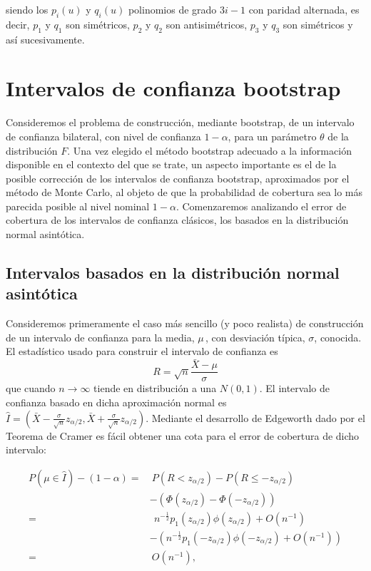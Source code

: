 \documentclass[]{book}
\theoremstyle{definition}
\theoremstyle{definition}
\theoremstyle{definition}
\theoremstyle{remark}
\begin{document}
siendo los \(p_i\left( u \right)\) y \(q_i\left( u \right)\) polinomios
de grado \(3i-1\) con paridad alternada, es decir, \(p_1\) y \(q_1\) son
simétricos, \(p_2\) y \(q_2\) son antisimétricos, \(p_3\) y \(q_3\) son
simétricos y así sucesivamente.

\chapter{Intervalos de confianza bootstrap}\label{cap5}

Consideremos el problema de construcción, mediante bootstrap, de un
intervalo de confianza bilateral, con nivel de confianza \(1-\alpha\),
para un parámetro \(\theta\) de la distribución \(F\). Una vez elegido
el método bootstrap adecuado a la información disponible en el contexto
del que se trate, un aspecto importante es el de la posible corrección
de los intervalos de confianza bootstrap, aproximados por el método de
Monte Carlo, al objeto de que la probabilidad de cobertura sea lo más
parecida posible al nivel nominal \(1-\alpha\). Comenzaremos analizando
el error de cobertura de los intervalos de confianza clásicos, los
basados en la distribución normal asintótica.

\section{Intervalos basados en la distribución normal
asintótica}\label{intervalos-basados-en-la-distribucion-normal-asintotica}

Consideremos primeramente el caso más sencillo (y poco realista) de
construcción de un intervalo de confianza para la media, \(\mu \,\), con
desviación típica, \(\sigma\), conocida. El estadístico usado para
construir el intervalo de confianza es
\[R=\sqrt{n}\frac{\bar{X}-\mu }{\sigma }\]que cuando
\(n\rightarrow \infty\) tiende en distribución a una
\(N\left( 0,1 \right)\). El intervalo de confianza basado en dicha
aproximación normal es
\(\hat{I}=\left( \bar{X}-\frac{\sigma }{\sqrt{n}}z_{\alpha /2}, \bar{X}+\frac{\sigma }{\sqrt{n}}z_{\alpha /2} \right)\).
Mediante el desarrollo de Edgeworth dado por el Teorema de Cramer es
fácil obtener una cota para el error de cobertura de dicho intervalo:

\[\begin{aligned}
P\left( \mu \in \hat{I} \right) -\left( 1-\alpha \right) =&\  P\left(
R<z_{\alpha /2} \right) -P\left( R\leq -z_{\alpha /2} \right) \\
&-\left( \Phi \left( z_{\alpha /2} \right) -\Phi \left( -z_{\alpha
/2} \right) \right) \\
=&\ \ n^{-\frac{1}{2}}p_1\left( z_{\alpha /2} \right) \phi \left( z_{\alpha
/2} \right) +O\left( n^{-1} \right) \\
&-\left( n^{-\frac{1}{2}}p_1\left( -z_{\alpha /2} \right) \phi \left(
-z_{\alpha /2} \right) +O\left( n^{-1} \right) \right) \\
=&\  O\left( n^{-1} \right),\end{aligned}\]
\end{document}
